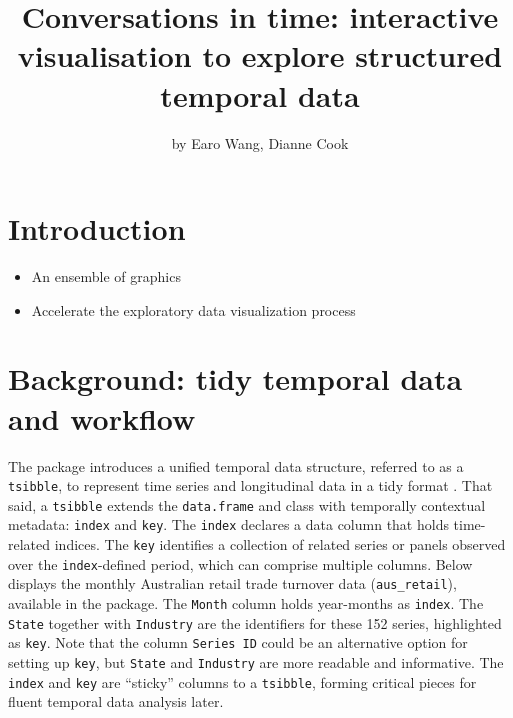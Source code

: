 \title{Conversations in time: interactive visualisation to explore
structured temporal data}
\author{by Earo Wang, Dianne Cook}

\maketitle


\hypertarget{introduction}{%
\section{Introduction}\label{introduction}}

\begin{itemize}
\tightlist
\item
  An ensemble of graphics
\item
  Accelerate the exploratory data visualization process
\end{itemize}

\hypertarget{background-tidy-temporal-data-and-workflow}{%
\section{Background: tidy temporal data and
workflow}\label{background-tidy-temporal-data-and-workflow}}

The  package \citep{wang2020tsibble} introduces a
unified temporal data structure, referred to as a \texttt{tsibble}, to
represent time series and longitudinal data in a tidy format
\citep{wickham2014tidy}. That said, a \texttt{tsibble} extends the
\texttt{data.frame} and  class with temporally
contextual metadata: \texttt{index} and \texttt{key}. The \texttt{index}
declares a data column that holds time-related indices. The \texttt{key}
identifies a collection of related series or panels observed over the
\texttt{index}-defined period, which can comprise multiple columns.
Below displays the monthly Australian retail trade turnover data
(\texttt{aus\_retail}), available in the  package.
The \texttt{Month} column holds year-months as \texttt{index}. The
\texttt{State} together with \texttt{Industry} are the identifiers for
these 152 series, highlighted as \texttt{key}. Note that the column
\texttt{Series\ ID} could be an alternative option for setting up
\texttt{key}, but \texttt{State} and \texttt{Industry} are more readable
and informative. The \texttt{index} and \texttt{key} are ``sticky''
columns to a \texttt{tsibble}, forming critical pieces for fluent
temporal data analysis later.

